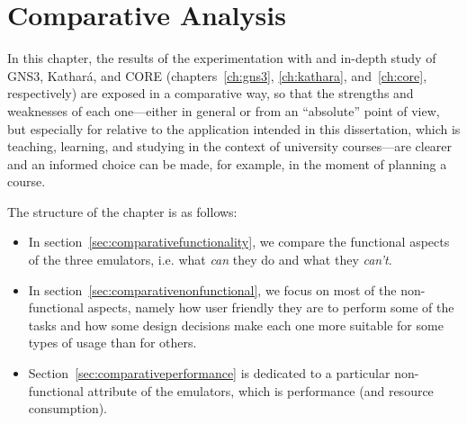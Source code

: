 
\chapter{Comparative Analysis}
\label{ch:comparative}

In this chapter, the results of the experimentation with and in-depth study of GNS3, Kathará, and CORE (chapters~\ref{ch:gns3}, \ref{ch:kathara}, and~\ref{ch:core}, respectively) are exposed in a comparative way, so that the strengths and weaknesses of each one---either in general or from an ``absolute'' point of view, but especially for relative to the application intended in this dissertation, which is teaching, learning, and studying in the context of university courses---are clearer and an informed choice can be made, for example, in the moment of planning a course.

The structure of the chapter is as follows:
\begin{itemize}
  \item In section~\ref{sec:comparativefunctionality}, we compare the functional aspects of the three emulators, i.e. what \emph{can} they do and what they \emph{can't}.
  \item In section~\ref{sec:comparativenonfunctional}, we focus on most of the non-functional aspects, namely how user friendly they are to perform some of the tasks and how some design decisions make each one more suitable for some types of usage than for others.
  \item Section~\ref{sec:comparativeperformance} is dedicated to a particular non-functional attribute of the emulators, which is performance (and resource consumption).
\end{itemize}







